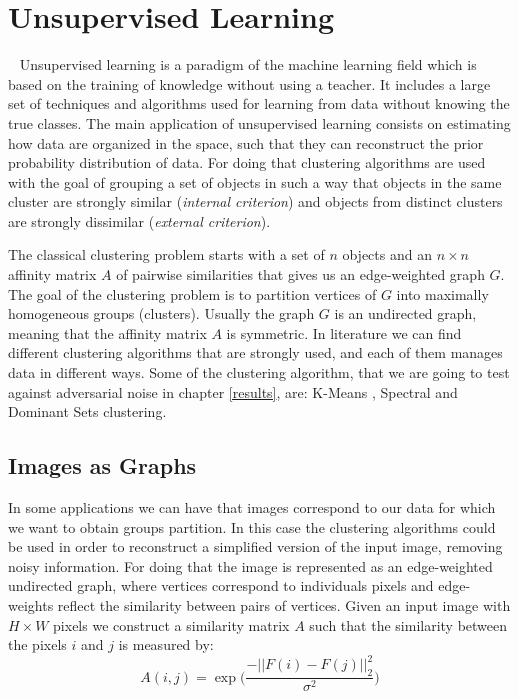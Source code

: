 \chapter{Unsupervised Learning}~\label{clustering}
Unsupervised learning is a paradigm of the machine learning field which is based on the training of knowledge without using a teacher.
It includes a large set of techniques and algorithms used for learning from data without knowing the true classes. The main application of unsupervised learning consists on estimating how data are organized in the space, such that they can reconstruct the prior probability distribution of data. For doing that clustering algorithms are used with the goal of grouping a set of objects in such a way that objects in the same cluster are strongly similar (\textit{internal criterion}) and objects from distinct clusters are strongly dissimilar (\textit{external criterion}).

The classical clustering problem starts with a set of $n$ objects and an $n \times n$ affinity matrix $A$ of pairwise similarities that gives us an edge-weighted graph $G$. The goal of the clustering problem is to partition vertices of $G$ into maximally homogeneous groups (clusters). Usually the graph $G$ is an undirected graph, meaning that the affinity matrix $A$ is symmetric.
In literature we can find different clustering algorithms that are strongly used, and each of them manages data in different ways. Some of the clustering algorithm, that we are going to test against adversarial noise in chapter \ref{results}, are: K-Means , Spectral and Dominant Sets clustering.

\section{Images as Graphs}
In some applications we can have that images correspond to our data for which we want to obtain groups partition. In this case the clustering algorithms could be used in order to reconstruct a simplified version of the input image, removing noisy information. For doing that the image is represented as an edge-weighted undirected graph, where vertices correspond to individuals pixels and edge-weights reflect the similarity between pairs of vertices.
Given an input image with $H \times W$ pixels we construct a similarity matrix $A$ such that the similarity between the pixels $i$ and $j$ is measured by:
$$A(i,j) = \exp\Big(\frac{-||F(i)- F(j)||^2_2}{\sigma^2}\Big)$$

